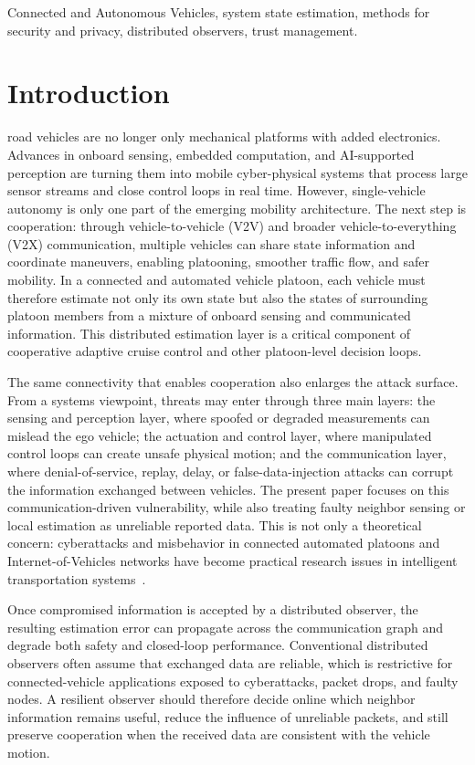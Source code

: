 \documentclass[letterpaper,journal]{IEEEtran}
\begin{document}
\begin{IEEEkeywords}
Connected and Autonomous Vehicles, system state estimation, methods for security and privacy, distributed observers, trust management.
\end{IEEEkeywords}

\section{Introduction}\label{sec_introduction}
 road vehicles are no longer only mechanical platforms with added electronics. Advances in onboard sensing, embedded computation, and AI-supported perception are turning them into mobile cyber-physical systems that process large sensor streams and close control loops in real time. However, single-vehicle autonomy is only one part of the emerging mobility architecture. The next step is cooperation: through vehicle-to-vehicle (V2V) and broader vehicle-to-everything (V2X) communication, multiple vehicles can share state information and coordinate maneuvers, enabling platooning, smoother traffic flow, and safer mobility. In a connected and automated vehicle platoon, each vehicle must therefore estimate not only its own state but also the states of surrounding platoon members from a mixture of onboard sensing and communicated information. This distributed estimation layer is a critical component of cooperative adaptive cruise control and other platoon-level decision loops.

The same connectivity that enables cooperation also enlarges the attack surface. From a systems viewpoint, threats may enter through three main layers: the sensing and perception layer, where spoofed or degraded measurements can mislead the ego vehicle; the actuation and control layer, where manipulated control loops can create unsafe physical motion; and the communication layer, where denial-of-service, replay, delay, or false-data-injection attacks can corrupt the information exchanged between vehicles. The present paper focuses on this communication-driven vulnerability, while also treating faulty neighbor sensing or local estimation as unreliable reported data. This is not only a theoretical concern: cyberattacks and misbehavior in connected automated platoons and Internet-of-Vehicles networks have become practical research issues in intelligent transportation systems~\cite{C_IDM,mousavinejad2019distributed,siddiqui2023trust_vehicles}.

Once compromised information is accepted by a distributed observer, the resulting estimation error can propagate across the communication graph and degrade both safety and closed-loop performance. Conventional distributed observers often assume that exchanged data are reliable, which is restrictive for connected-vehicle applications exposed to cyberattacks, packet drops, and faulty nodes. A resilient observer should therefore decide online which neighbor information remains useful, reduce the influence of unreliable packets, and still preserve cooperation when the received data are consistent with the vehicle motion.
\end{document}
